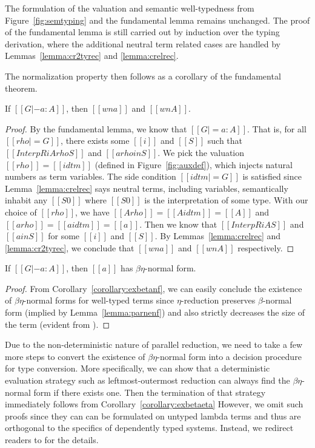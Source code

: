 \documentclass[acmsmall,screen=true,
\ifpublic review=false\else,review=true\fi
  ,anonymous=\ifanonymous true\else false\fi]{acmart}
\begin{document}
The formulation of the valuation and semantic well-typedness from
Figure~\ref{fig:semtyping} and the fundamental lemma remains
unchanged.
The proof of the fundamental lemma is still carried out by induction
over the typing derivation, where the additional neutral term related
cases are handled by Lemmas~\ref{lemma:cr2tyrec} and
\ref{lemma:crelrec}.

The normalization property then follows as a corollary of the
fundamental theorem.
\begin{corollary}
  \label{corollary:exbetanf}
  If $[[G |- a : A]]$, then $[[wn a]]$ and $[[wn A]]$.
\end{corollary}
\begin{proof}
  By the fundamental lemma, we know that $[[G |= a : A]]$. That is,
  for all $[[rho |= G]]$, there exists some $[[i]]$ and $[[S]]$ such
  that $[[InterpR i A {rho} S]]$ and $[[a {rho} in S]]$.
  We pick the valuation $[[rho]] = [[idtm]]$ (defined in Figure~\ref{fig:auxdef}), which injects
  natural numbers as term variables. The side condition $[[idtm |=
  G]]$ is satisfied since Lemma~\ref{lemma:crelrec} says neutral terms,
  including variables, semantically inhabit any $[[S0]]$ where
  $[[S0]]$ is the interpretation of some type. With our choice of
  $[[rho]]$, we have $[[A {rho}]] = [[A {idtm}]] = [[A]]$ and $[[a {rho}]] = [[a{idtm}]] = [[a]]$. Then we
  know that $[[InterpR i A S]]$ and $[[a in S]]$ for some $[[i]]$ and
  $[[S]]$. By Lemmas~\ref{lemma:crelrec} and \ref{lemma:cr2tyrec}, we
  conclude that $[[wn a]]$ and $[[wn A]]$ respectively.
\end{proof}
\begin{corollary}
\label{corollary:exbetaeta}
If $[[G |- a : A]]$, then $[[a]]$ has $\beta\eta$-normal form.
\end{corollary}
\begin{proof}
  From Corollary~\ref{corollary:exbetanf}, we can easily conclude the
  existence of $\beta\eta$-normal forms for well-typed terms since
  $\eta$-reduction preserves $\beta$-normal form (implied by
  Lemma~\ref{lemma:parnenf}) and also strictly decreases the size of
  the term (evident from ).
\end{proof}

Due to the non-deterministic nature of parallel reduction, we need to
take a few more steps to convert the existence of $\beta\eta$-normal
form into a decision procedure for type conversion. More specifically,
we can show that a deterministic evaluation strategy such as
leftmost-outermost reduction can always find the $\beta\eta$-normal
form if there exists one. Then the termination of that strategy
immediately follows from Corollary~\ref{corollary:exbetaeta} However, we omit such proofs since they can
can be formulated on untyped lambda terms and thus are orthogonal to
the specifics of dependently typed systems. Instead, we redirect
readers to \citet{factorization-essentially,
takahashi-parallel-reduction} for the details.
\end{document}

